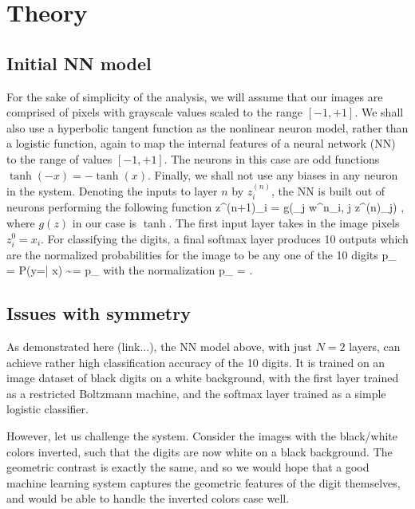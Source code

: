 \documentclass[twocolumn, prl]{revtex4-1}
\begin{document}

\section{Theory}
\subsection{Initial NN model}
\label{Sec:dumb_NN}

For the sake of simplicity of the analysis, we will assume that our images are comprised of pixels with grayscale values scaled to the 
range $[-1,+1]$. We shall also use a hyperbolic tangent function as the nonlinear neuron model, rather than a logistic function, again to map the internal features of a neural network (NN) to the range of values $[-1, +1]$. The neurons in this case are odd functions $\tanh(-x) = - \tanh(x)$.
Finally, we shall not use any biases in any neuron in the system. Denoting the inputs to layer $n$ by $z^{(n)}_i$, the NN is built out of neurons performing the following function
\be
z^{(n+1)}_i = g\left(\sum_j w^n_{i, j} z^{(n)}_j\right)
\; ,
\ee
where $g(z)$ in our case is $\tanh$.
The first input layer takes in the image pixels $z^0_i = x_i$. For classifying the digits, a final softmax layer produces 10 outputs which are the normalized probabilities for the image to be any one of the 10 digits
\be
p_{\alpha} = P(y=\alpha | x) \sim \exp{} = {\tilde p}_{\alpha}
\ee
with the normalization
\be
p_{\alpha} = 
\; .
\ee

\subsection{Issues with symmetry}

As demonstrated here (link...), the NN model above, with just $N=2$ layers, can achieve rather high classification accuracy of the 10 digits.
It is trained on an image dataset of black digits on a white background, with the first layer trained as a restricted Boltzmann machine, and the softmax layer trained as a simple logistic classifier.

However, let us challenge the system. Consider the images with the black/white colors inverted, such that the digits are now white on 
a black background. The geometric contrast is exactly the same, and so we would hope that a good machine learning system captures the geometric features of the digit themselves, and would be able to handle the inverted colors case well.
\end{document}
